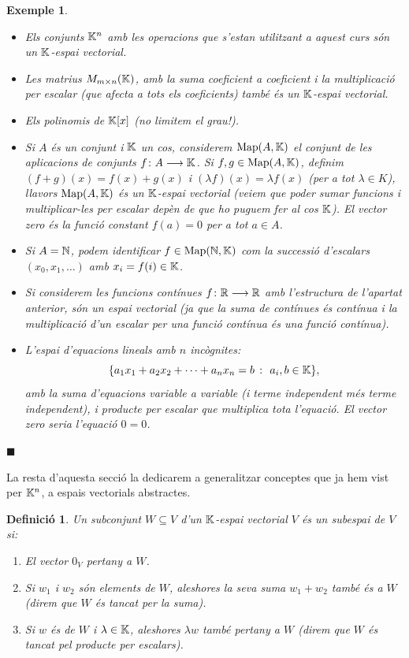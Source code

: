 \documentclass[
  11pt,
]{book}
\numberwithin{dummy}{section}
\theoremstyle{maincolornumbox}
\theoremstyle{blacknumex}
\newtheorem{exampleT}{Exemple}[chapter]
\theoremstyle{blacknumbox}
\newtheorem{definitionT}{Definició}[chapter]
\theoremstyle{maincolornum}
\newenvironment{definition}{\begin{dBox}\begin{definitionT}}{\end{definitionT}\end{dBox}}
\newenvironment{example}{\begin{exampleT}}{\hfill{\tiny\ensuremath{\blacksquare}}\end{exampleT}}
\newlength\esp
\begin{document}
\begin{example}
\leavevmode

\begin{itemize}
\item
  Els conjunts \(\mathbb{K}^n\) amb les operacions que s'estan utilitzant a
  aquest curs són un \(\mathbb{K}\)-espai vectorial.
\item
  Les matrius \(M_{m\times n}(\mathbb{K})\), amb la suma coeficient a coeficient
  i la multiplicació per escalar (que afecta a tots els coeficients)
  també és un \(\mathbb{K}\)-espai vectorial.
\item
  Els polinomis de \(\mathbb{K}[x]\) (no limitem el grau!).
\item
  Si \(A\) és un conjunt i \(\mathbb{K}\) un cos, considerem \(\operatorname{Map}(A,\mathbb{K})\) el
  conjunt de les aplicacions de conjunts \(f\colon A \longrightarrow \mathbb{K}\). Si
  \(f,g\in\operatorname{Map}(A,\mathbb{K})\), definim \((f+g)(x)=f(x)+g(x)\) i
  \((\lambda f)(x)=\lambda f(x)\) (per a tot \(\lambda \in K\)), llavors
  \(\operatorname{Map}(A,\mathbb{K})\) és un \(\mathbb{K}\)-espai vectorial (veiem que poder sumar
  funcions i multiplicar-les per escalar depèn de que ho puguem fer al
  cos \(\mathbb{K}\)). El vector zero és la funció constant \(f(a)=0\) per a tot
  \(a\in A\).
\item
  Si \(A=\mathbb{N}\), podem identificar \(f\in \operatorname{Map}(\mathbb{N},\mathbb{K})\) com la successió
  d'escalars \((x_0,x_1,\dots)\) amb \(x_i=f(i)\in \mathbb{K}\).
\item
  Si considerem les funcions contínues \(f\colon \mathbb{R} \longrightarrow \mathbb{R}\) amb
  l'estructura de l'apartat anterior, són un espai vectorial (ja que
  la suma de contínues és contínua i la multiplicació d'un escalar per
  una funció contínua és una funció contínua).
\item
  L'espai d'equacions lineals amb \(n\) incògnites:
  \[\{a_1x_1+a_2x_2+\cdots+a_nx_n=b ~\colon~ a_i, b \in\mathbb{K}\},\] amb la
  suma d'equacions variable a variable (i terme independent més terme
  independent), i producte per escalar que multiplica tota l'equació.
  El vector zero seria l'equació \(0=0\).
\end{itemize}

\end{example}

La resta d'aquesta secció la dedicarem a generalitzar conceptes que ja
hem vist per \(\mathbb{K}^n\), a espais vectorials abstractes.

\begin{definition}

Un subconjunt \(W\subseteq V\) d'un \(\mathbb{K}\)-espai vectorial \(V\) és un
\emph{subespai} de \(V\) si:

\begin{enumerate}
\def\labelenumi{\arabic{enumi}.}
\item
  El vector \(0_V\) pertany a \(W\).
\item
  Si \(w_1\) i \(w_2\) són elements de \(W\), aleshores la seva suma
  \(w_1+w_2\) també és a \(W\) (direm que \(W\) és tancat per la suma).
\item
  Si \(w\) és de \(W\) i \(\lambda \in\mathbb{K}\), aleshores \(\lambda w\) també
  pertany a \(W\) (direm que \(W\) és tancat pel producte per escalars).
\end{enumerate}

\end{definition}
\end{document}
